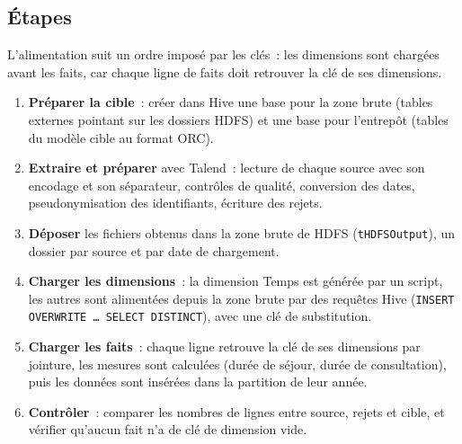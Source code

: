\subsection{Étapes}

\noindent L'alimentation suit un ordre imposé par les clés~: les dimensions sont chargées avant les faits, car chaque ligne de faits doit retrouver la clé de ses dimensions.

\begin{center}
\end{center}

\begin{enumerate}
	\item \textbf{Préparer la cible}~: créer dans Hive une base pour la zone brute (tables externes pointant sur les dossiers HDFS) et une base pour l'entrepôt (tables du modèle cible au format ORC).
	\item \textbf{Extraire et préparer} avec Talend~: lecture de chaque source avec son encodage et son séparateur, contrôles de qualité, conversion des dates, pseudonymisation des identifiants, écriture des rejets.
	\item \textbf{Déposer} les fichiers obtenus dans la zone brute de HDFS (\texttt{tHDFSOutput}), un dossier par source et par date de chargement.
	\item \textbf{Charger les dimensions}~: la dimension Temps est générée par un script, les autres sont alimentées depuis la zone brute par des requêtes Hive (\texttt{INSERT OVERWRITE \dots\ SELECT DISTINCT}), avec une clé de substitution.
	\item \textbf{Charger les faits}~: chaque ligne retrouve la clé de ses dimensions par jointure, les mesures sont calculées (durée de séjour, durée de consultation), puis les données sont insérées dans la partition de leur année.
	\item \textbf{Contrôler}~: comparer les nombres de lignes entre source, rejets et cible, et vérifier qu'aucun fait n'a de clé de dimension vide.
\end{enumerate}

